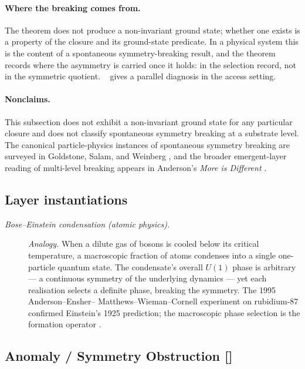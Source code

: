 \paragraph{Where the breaking comes from.}
The theorem does not produce a non-invariant ground state; whether one exists
is a property of the closure and its ground-state predicate. In a physical
system this is the content of a spontaneous symmetry-breaking result, and the
theorem records where the asymmetry is carried once it holds: in the
selection record, not in the symmetric quotient. \PaperCSL\
\citep{Tsiokos2026CSL} gives a parallel diagnosis in the access setting.


\paragraph{Nonclaims.} This subsection does not exhibit a non-invariant
ground state for any particular closure and does not classify spontaneous
symmetry breaking at a substrate level.  The canonical particle-physics
instances of spontaneous symmetry breaking are surveyed in Goldstone, Salam,
and Weinberg \citep{Goldstone1962BrokenSymmetries}, and the broader
emergent-layer reading of multi-level breaking appears in Anderson's
\emph{More is Different} \citep{Anderson1972MoreIsDifferent}.

\subsection*{Layer instantiations}\label{layer-inst:F15b}

\begingroup\small
\begin{description}
\item[\emph{Bose--Einstein condensation (atomic physics).}] \textit{Analogy.}
When a dilute gas of bosons is cooled below its critical
temperature, a macroscopic fraction of atoms condenses into a
single one-particle quantum state.  The condensate's overall
\(U(1)\) phase is arbitrary --- a continuous symmetry of the
underlying dynamics --- yet each realisation selects a definite
phase, breaking the symmetry.  The 1995 Anderson--Ensher--
Matthews--Wieman--Cornell experiment on rubidium-87 confirmed
Einstein's 1925 prediction; the macroscopic phase selection is the
\Fref{F15b} formation operator
\citep{AndersonEnsherMatthewsWiemanCornell1995BEC}.

\end{description}
\endgroup


\subsection{Anomaly / Symmetry Obstruction [\texorpdfstring{}{F40}]}\label{sec:symmetry:anomaly}

